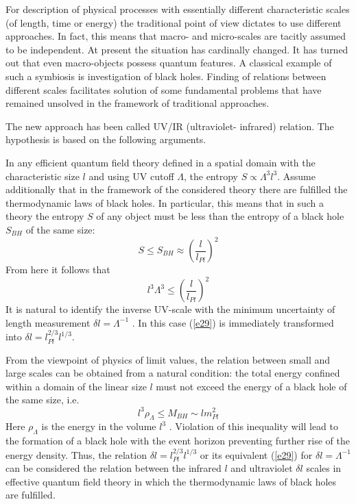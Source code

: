 \documentclass [12pt]{article}
\begin{document}
For description of physical processes with essentially different characteristic scales (of length, time or energy) the traditional point of view dictates to use different approaches. In fact, this means that  macro- and micro-scales are tacitly  assumed to be independent. At present the situation has cardinally changed. It has turned out that even macro-objects possess quantum features. A classical example of such a symbiosis is investigation of black holes. Finding of relations between different scales facilitates  solution of some fundamental problems that have remained unsolved in the framework of traditional approaches.

The new approach \cite{s27} has been called  UV/IR (ultraviolet- infrared)  relation. The hypothesis is based on the following arguments.

In any efficient quantum field theory defined in a spatial domain with the characteristic size   $l$ and using  UV cutoff $\Lambda$, the entropy $S \propto {\Lambda ^3}{l^3}$. Assume additionally that in the framework of the considered theory there are fulfilled the thermodynamic laws of black holes. In particular, this means that in such a theory the entropy $S$ of any object  must be less than the entropy of a black hole  ${S_{BH}}$ of the same size:
\begin{equation}\label{e28}
  S \le {S_{BH}} \approx {\left( {\frac{l}{{{l_{Pl}}}}} \right)^2}
\end{equation}
From here it follows that
\begin{equation}\label{e29}
  {l^3}{\Lambda ^3} \le {\left( {\frac{l}{{{l_{Pl}}}}} \right)^2}
\end{equation}
It is natural to identify the inverse UV-scale with the minimum uncertainty of length measurement $\delta l = {\Lambda ^{ - 1}}$ . In this case   (\ref{e29}) is  immediately transformed into $\delta l = l_{Pl}^{2/3}{l^{1/3}}$.

From the viewpoint of physics of limit values, the relation between small and large scales can be obtained from a  natural condition: the total energy confined within a domain of the  linear size  $l$ must not exceed the energy of a black hole of the same size, i.e.
\begin{equation}\label{e30}
  {l^3}{\rho _\Lambda } \le {M_{BH}} \sim lm_{Pl}^2
\end{equation}
Here  ${\rho _\Lambda }$ is the energy in the volume  ${l^3}$ . Violation of this inequality will lead to the formation of a black hole with the event horizon   preventing further rise of the energy density.
Thus, the relation $\delta l = l_{Pl}^{2/3}{l^{1/3}}$ or its equivalent  (\ref{e29})  for $\delta l = {\Lambda ^{-1}}$ can be considered  the relation between the infrared $l$ and ultraviolet $\delta l$  scales in effective quantum field theory  in which the thermodynamic laws of black holes are fulfilled.
\end{document}
